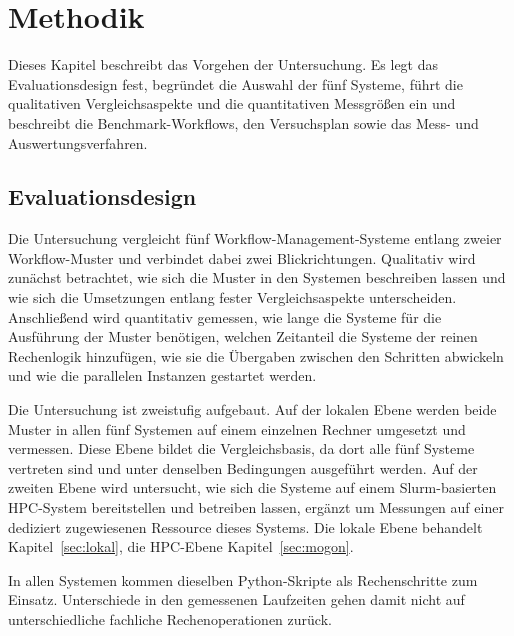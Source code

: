 
\lstset{breaklines=true, breakatwhitespace=false}

\chapter{Methodik}
\label{sec:methodik}

Dieses Kapitel beschreibt das Vorgehen der Untersuchung. Es legt das
Evaluationsdesign fest, begründet die Auswahl der fünf Systeme,
führt die qualitativen Vergleichsaspekte und die quantitativen
Messgrößen ein und beschreibt die Benchmark-Workflows, den
Versuchsplan sowie das Mess- und Auswertungsverfahren.

\section{Evaluationsdesign}
\label{sec:methodik:design}

Die Untersuchung vergleicht fünf Workflow-Management-Systeme entlang
zweier Workflow-Muster und verbindet dabei zwei Blickrichtungen.
Qualitativ wird zunächst betrachtet, wie sich die Muster in den
Systemen beschreiben lassen und wie sich die Umsetzungen entlang
fester Vergleichsaspekte unterscheiden. Anschließend wird
quantitativ gemessen, wie lange die Systeme für die Ausführung der
Muster benötigen, welchen Zeitanteil die Systeme der reinen
Rechenlogik hinzufügen, wie sie die Übergaben zwischen den Schritten
abwickeln und wie die parallelen Instanzen gestartet werden.

Die Untersuchung ist zweistufig aufgebaut. Auf der lokalen Ebene
werden beide Muster in allen fünf Systemen auf einem einzelnen
Rechner umgesetzt und vermessen. Diese Ebene bildet die
Vergleichsbasis, da dort alle fünf Systeme vertreten sind und
unter denselben Bedingungen ausgeführt werden. Auf der zweiten Ebene wird untersucht, wie sich die
Systeme auf einem Slurm-basierten HPC-System bereitstellen und
betreiben lassen, ergänzt um Messungen auf einer dediziert
zugewiesenen Ressource dieses Systems. Die lokale Ebene behandelt
Kapitel~\ref{sec:lokal}, die HPC-Ebene Kapitel~\ref{sec:mogon}.

In allen Systemen kommen dieselben Python-Skripte als Rechenschritte
zum Einsatz. Unterschiede in den gemessenen Laufzeiten gehen damit
nicht auf unterschiedliche fachliche Rechenoperationen zurück.

